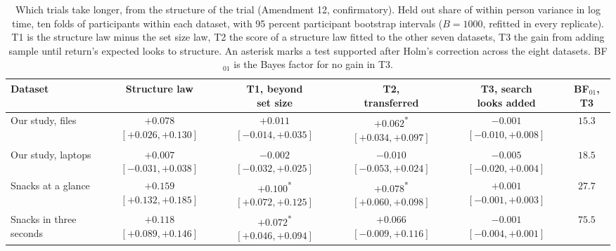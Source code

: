 \begin{table}[t]
\centering
\footnotesize
\setlength{\tabcolsep}{4pt}
\caption{Which trials take longer, from the structure of the trial (Amendment 12, confirmatory). Held out share of within person variance in log time, ten folds of participants within each dataset, with 95 percent participant bootstrap intervals ($B = 1000$, refitted in every replicate). T1 is the structure law minus the set size law, T2 the score of a structure law fitted to the other seven datasets, T3 the gain from adding sample until return's expected looks to structure. An asterisk marks a test supported after Holm's correction across the eight datasets. BF$_{01}$ is the Bayes factor for no gain in T3.}
\label{tab:a12}
\begin{tabular}{lccccc}
\toprule
Dataset & Structure law & \makecell{T1, beyond\\set size} & \makecell{T2,\\transferred} & \makecell{T3, search\\looks added} & BF$_{01}$, T3 \\
\midrule
Our study, files & \makecell{$+0.078$ \\ {\scriptsize $[+0.026, +0.130]$}} & \makecell{$+0.011$ \\ {\scriptsize $[-0.014, +0.035]$}} & \makecell{$+0.062$\textsuperscript{*} \\ {\scriptsize $[+0.034, +0.097]$}} & \makecell{$-0.001$ \\ {\scriptsize $[-0.010, +0.008]$}} & $15.3$ \\
Our study, laptops & \makecell{$+0.007$ \\ {\scriptsize $[-0.031, +0.038]$}} & \makecell{$-0.002$ \\ {\scriptsize $[-0.032, +0.025]$}} & \makecell{$-0.010$ \\ {\scriptsize $[-0.053, +0.024]$}} & \makecell{$-0.005$ \\ {\scriptsize $[-0.020, +0.004]$}} & $18.5$ \\
Snacks at a glance & \makecell{$+0.159$ \\ {\scriptsize $[+0.132, +0.185]$}} & \makecell{$+0.100$\textsuperscript{*} \\ {\scriptsize $[+0.072, +0.125]$}} & \makecell{$+0.078$\textsuperscript{*} \\ {\scriptsize $[+0.060, +0.098]$}} & \makecell{$+0.001$ \\ {\scriptsize $[-0.001, +0.003]$}} & $27.7$ \\
Snacks in three seconds & \makecell{$+0.118$ \\ {\scriptsize $[+0.089, +0.146]$}} & \makecell{$+0.072$\textsuperscript{*} \\ {\scriptsize $[+0.046, +0.094]$}} & \makecell{$+0.066$ \\ {\scriptsize $[-0.009, +0.116]$}} & \makecell{$-0.001$ \\ {\scriptsize $[-0.004, +0.001]$}} & $75.5$ \\

\end{tabular}
\end{table}
